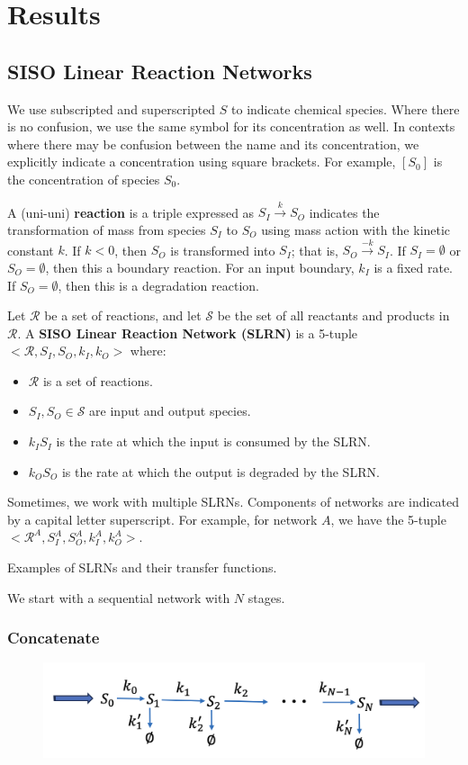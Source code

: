 \documentclass[unnumsec,webpdf,contemporary,large]{oup-authoring-template}%
\theoremstyle{thmstyleone}%
\theoremstyle{thmstyletwo}%
\theoremstyle{thmstylethree}%
\begin{document}
\section{Results}\label{results}
\subsection{SISO Linear Reaction Networks}

We use subscripted and superscripted $S$ to indicate chemical species. Where there is no confusion, we use the same symbol for its concentration as well. In contexts where there may be confusion between the name and its concentration, we explicitly indicate a concentration using square brackets. For example, $[S_0]$ is the concentration of species $S_0$.

A (uni-uni) {\bf reaction} is a triple expressed as $S_I \xrightarrow{k} S_O$ indicates the transformation of mass from species $S_I$ to $S_O$ using mass action with the kinetic constant $k$. If $k < 0$, then $S_O$ is transformed into $S_I$; that is, $S_O \xrightarrow{-k} S_I$. If $S_I = \emptyset$ or $S_O = \emptyset$, then this a boundary reaction. For an input boundary, $k_I$ is a fixed rate. If $S_O = \emptyset$, then this is a degradation reaction.

Let $\mathcal{R}$ be a set of reactions, and let
$\mathcal{S}$ be the set of all reactants and products in $\mathcal{R}$.
A {\bf SISO Linear Reaction Network (SLRN)} is
a 5-tuple
$<\mathcal{R}, S_I, S_O, k_I, k_O>$ where:
\begin{itemize}
    \item $\mathcal{R}$ is a set of reactions.
    \item 
    $S_I, S_O \in \mathcal{S}$ are input and output species.
    \item $k_I S_I$ is the rate at which the input is consumed
    by the SLRN.
    \item $k_O S_O$ is the rate at which the output is degraded by the SLRN.
\end{itemize}
Sometimes, we work with multiple SLRNs. Components of networks are indicated by a
capital letter superscript.
For example, for network $A$, we have the 5-tuple
$<\mathcal{R}^A, S^A_I, S^A_O, k^A_I, k^A_O>$.

Examples of SLRNs and their transfer functions.

We start with a sequential network with $N$ stages.
\subsubsection{Concatenate}
\begin{figure}
        \centering
         \includegraphics[scale=0.4]{figures/sequential_network.png}
         \caption[]{}
         \label{fig:concatenate}
\end{figure}
\end{document}
